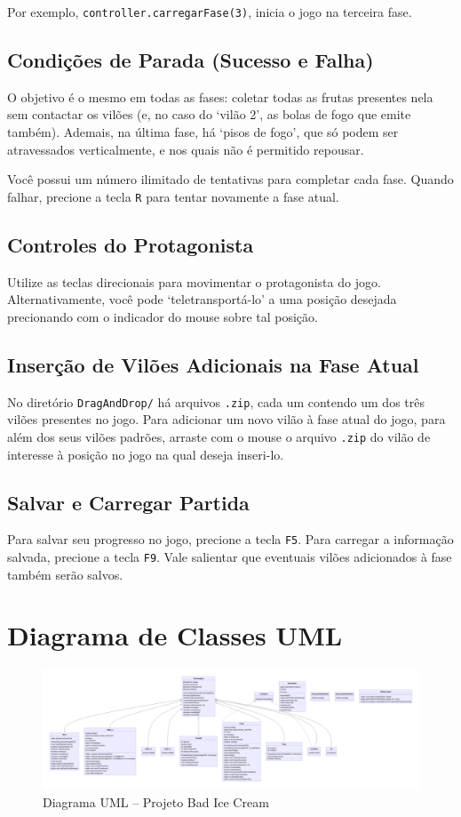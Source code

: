 \documentclass[12pt,a4paper,portuguese]{article}
\begin{document}
        Por exemplo, \verb|controller.carregarFase(3)|, inicia o jogo na terceira fase.

    \subsection{Condições de Parada (Sucesso e Falha)}
        O objetivo é o mesmo em todas as fases: coletar todas as frutas presentes nela sem contactar os vilões (e, no caso do `vilão 2', as bolas de fogo que emite também). Ademais, na última fase, há `pisos de fogo', que só podem ser atravessados verticalmente, e nos quais não é permitido repousar.
        
        Você possui um número ilimitado de tentativas para completar cada fase. Quando falhar, precione a tecla \verb|R| para tentar novamente a fase atual.
        
    \subsection{Controles do Protagonista}
        Utilize as teclas direcionais para movimentar o protagonista do jogo. Alternativamente, você pode `teletransportá-lo' a uma posição desejada precionando com o indicador do mouse sobre tal posição.
        
    \subsection{Inserção de Vilões Adicionais na Fase Atual}
        No diretório \verb|DragAndDrop/| há arquivos \verb|.zip|, cada um contendo um dos três vilões presentes no jogo. Para adicionar um novo vilão à fase atual do jogo, para além dos seus vilões padrões, arraste com o mouse o arquivo \verb|.zip| do vilão de interesse à posição no jogo na qual deseja inseri-lo.
        
    \subsection{Salvar e Carregar Partida}
        Para salvar seu progresso no jogo, precione a tecla \verb|F5|. Para carregar a informação salvada, precione a tecla \verb|F9|. Vale salientar que eventuais vilões adicionados à fase também serão salvos.
    \section{Diagrama de Classes UML}
    \begin{figure}[H]
        \centering
        \includegraphics[width=1\textwidth]{class-diagram.png}
        \caption{Diagrama UML -- Projeto Bad Ice Cream}
        \label{fig:class-diagram}
    \end{figure}
\end{document}
